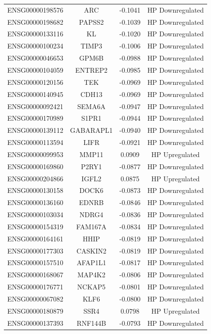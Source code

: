 \documentclass[
]{article}
\begin{document}
\begin{singlespace}
\begin{longtable}[t]{lccc}
ENSG00000198576 & ARC & -0.1041 & HP Downregulated\\
ENSG00000198682 & PAPSS2 & -0.1039 & HP Downregulated\\
ENSG00000133116 & KL & -0.1020 & HP Downregulated\\
\addlinespace
ENSG00000100234 & TIMP3 & -0.1006 & HP Downregulated\\
ENSG00000046653 & GPM6B & -0.0988 & HP Downregulated\\
ENSG00000104059 & ENTREP2 & -0.0985 & HP Downregulated\\
ENSG00000120156 & TEK & -0.0969 & HP Downregulated\\
ENSG00000140945 & CDH13 & -0.0969 & HP Downregulated\\
\addlinespace
ENSG00000092421 & SEMA6A & -0.0947 & HP Downregulated\\
ENSG00000170989 & S1PR1 & -0.0944 & HP Downregulated\\
ENSG00000139112 & GABARAPL1 & -0.0940 & HP Downregulated\\
ENSG00000113594 & LIFR & -0.0921 & HP Downregulated\\
ENSG00000099953 & MMP11 & 0.0909 & HP Upregulated\\
\addlinespace
ENSG00000169860 & P2RY1 & -0.0877 & HP Downregulated\\
ENSG00000204866 & IGFL2 & 0.0875 & HP Upregulated\\
ENSG00000130158 & DOCK6 & -0.0873 & HP Downregulated\\
ENSG00000136160 & EDNRB & -0.0846 & HP Downregulated\\
ENSG00000103034 & NDRG4 & -0.0836 & HP Downregulated\\
\addlinespace
ENSG00000154319 & FAM167A & -0.0834 & HP Downregulated\\
ENSG00000164161 & HHIP & -0.0819 & HP Downregulated\\
ENSG00000177303 & CASKIN2 & -0.0819 & HP Downregulated\\
ENSG00000157510 & AFAP1L1 & -0.0817 & HP Downregulated\\
ENSG00000168067 & MAP4K2 & -0.0806 & HP Downregulated\\
\addlinespace
ENSG00000176771 & NCKAP5 & -0.0801 & HP Downregulated\\
ENSG00000067082 & KLF6 & -0.0800 & HP Downregulated\\
ENSG00000180879 & SSR4 & 0.0798 & HP Upregulated\\
ENSG00000137393 & RNF144B & -0.0793 & HP Downregulated\\

\end{longtable}
\end{singlespace}
\end{document}
